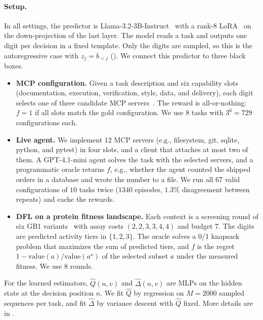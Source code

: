 \documentclass[10pt]{article}
\theoremstyle{plain}
\theoremstyle{definition}
\theoremstyle{remark}
\theoremstyle{definition}
\newcommand{\ctx}[1]{z_{#1}}                 %
\begin{document}
\paragraph{Setup.} In all settings, the predictor is Llama-3.2-3B-Instruct~\cite{grattafiori2024llama3} with a rank-8 LoRA~\cite{hu2022lora} on the down-projection of the last layer. The model reads a task and outputs one digit per decision in a fixed template. Only the digits are sampled, so this is the autoregressive case with $\ctx{j}=b_{<j}$ (). We connect this predictor to three black boxes.
\begin{itemize}[leftmargin=1.5em]
    \item \textbf{MCP configuration.} Given a task description and six capability slots (documentation, execution, verification, style, data, and delivery), each digit selects one of three candidate MCP servers~\cite{mcp2024}. The reward is all-or-nothing: $f=1$ if all slots match the gold configuration. We use $8$ tasks with $3^6=729$ configurations each.
    \item \textbf{Live agent.} We implement $12$ MCP servers (e.g., filesystem, git, sqlite, python, and pytest) in four slots, and a client that attaches at most two of them. A GPT-4.1-mini agent solves the task with the selected servers, and a programmatic oracle returns $f$, e.g., whether the agent counted the shipped orders in a database and wrote the number to a file. We run all $67$ valid configurations of $10$ tasks twice ($1340$ episodes, $1.3\%$ disagreement between repeats) and cache the rewards.
    \item \textbf{DFL on a protein fitness landscape.} Each context is a screening round of six GB1 variants~\cite{wu2016gb1,dallago2021flip} with assay costs $(2,2,3,3,4,4)$ and budget $7$. The digits are predicted activity tiers in $\{1,2,3\}$. The oracle solves a 0/1 knapsack problem that maximizes the sum of predicted tiers, and $f$ is the regret $1-\mathrm{value}(a)/\mathrm{value}(a^{\star})$ of the selected subset $a$ under the measured fitness. We use $8$ rounds.
\end{itemize}
For the learned estimators, $\hat Q(n,v)$ and $\hat\Delta(n,v)$ are MLPs on the hidden state at the decision position $n$. We fit $\hat Q$ by regression on $M=2000$ sampled sequences per task, and fit $\hat\Delta$ by variance descent with $\hat Q$ fixed. More details are in .
\end{document}
